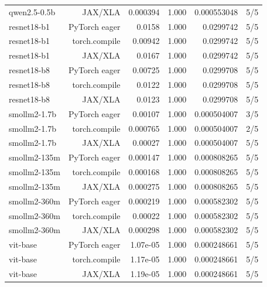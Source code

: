 \begin{tabular}{lrrrrr}
qwen2.5-0.5b & JAX/XLA & 0.000394 & 1.000 & 0.000553048 & 5/5 \\
resnet18-b1 & PyTorch eager & 0.0158 & 1.000 & 0.0299742 & 5/5 \\
resnet18-b1 & torch.compile & 0.00942 & 1.000 & 0.0299742 & 5/5 \\
resnet18-b1 & JAX/XLA & 0.0167 & 1.000 & 0.0299742 & 5/5 \\
resnet18-b8 & PyTorch eager & 0.00725 & 1.000 & 0.0299708 & 5/5 \\
resnet18-b8 & torch.compile & 0.0122 & 1.000 & 0.0299708 & 5/5 \\
resnet18-b8 & JAX/XLA & 0.0123 & 1.000 & 0.0299708 & 5/5 \\
smollm2-1.7b & PyTorch eager & 0.00107 & 1.000 & 0.000504007 & 3/5 \\
smollm2-1.7b & torch.compile & 0.000765 & 1.000 & 0.000504007 & 2/5 \\
smollm2-1.7b & JAX/XLA & 0.00027 & 1.000 & 0.000504007 & 5/5 \\
smollm2-135m & PyTorch eager & 0.000147 & 1.000 & 0.000808265 & 5/5 \\
smollm2-135m & torch.compile & 0.000168 & 1.000 & 0.000808265 & 5/5 \\
smollm2-135m & JAX/XLA & 0.000275 & 1.000 & 0.000808265 & 5/5 \\
smollm2-360m & PyTorch eager & 0.000219 & 1.000 & 0.000582302 & 5/5 \\
smollm2-360m & torch.compile & 0.00022 & 1.000 & 0.000582302 & 5/5 \\
smollm2-360m & JAX/XLA & 0.000298 & 1.000 & 0.000582302 & 5/5 \\
vit-base & PyTorch eager & 1.07e-05 & 1.000 & 0.000248661 & 5/5 \\
vit-base & torch.compile & 1.17e-05 & 1.000 & 0.000248661 & 5/5 \\
vit-base & JAX/XLA & 1.19e-05 & 1.000 & 0.000248661 & 5/5 \\
\bottomrule
\end{tabular}
